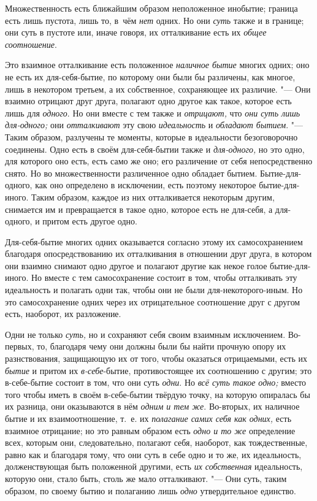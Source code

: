 Множественность есть ближайшим образом неположенное инобытие; граница есть лишь
пустота, лишь то, в~чём {\em нет} одних. Но они {\em суть} также и в границе;
они суть в пустоте или, иначе говоря, их отталкивание есть их
{\em общее соотношение}.

Это взаимное отталкивание есть положенное {\em наличное бытие} многих одних;
оно не есть их для-себя-бытие, по которому они были бы различены, как многое,
лишь в некотором третьем, а их собственное, сохраняющее их различие. "--- Они
взаимно отрицают друг друга, полагают одно другое как такое, которое есть лишь
для {\em одного}. Но они вместе с тем также и {\em отрицают,} что
{\em они суть лишь для-одного;} они {\em отталкивают} эту свою
{\em идеальность} и {\em обладают бытием}. "--- Таким образом, разлучены те
моменты, которые в идеальности безоговорочно соединены. Одно есть в своём
для-себя-бытии также и {\em для-одного,} но это одно, для которого оно есть,
есть само же оно; его различение от себя непосредственно снято. Но во
множественности различенное одно обладает бытием. Бытие-для-одного, как оно
определено в исключении, есть поэтому некоторое бытие-для-иного. Таким образом,
каждое из них отталкивается некоторым другим, снимается им и превращается в
такое одно, которое есть не для-себя, а для-одного, и притом есть другое одно.

Для-себя-бытие многих одних оказывается согласно этому их самосохранением
благодаря опосредствованию их отталкивания в отношении друг друга, в котором
они взаимно снимают одно другое и полагают другие как некое голое
бытие-для-иного. Но вместе с тем самосохранение состоит в том, чтобы
отталкивать эту идеальность и полагать одни так, чтобы они не были
для-некоторого-иным. Но это самосохранение одних через их отрицательное
соотношение друг с другом есть, наоборот, их разложение.

Одни не только {\em суть,} но и сохраняют себя своим взаимным исключением.
Во-первых, то, благодаря чему они должны были бы найти прочную опору их
разнствования, защищающую их от того, чтобы оказаться отрицаемыми, есть их
{\em бытие} и притом их {\em в-себе}-бытие, противостоящее их соотношению с
другим; это в-себе-бытие состоит в том, что они суть {\em одни}. Но
{\em всё суть такое одно;} вместо того чтобы иметь в своём в-себе-бытии твёрдую
точку, на которую опиралась бы их разница, они оказываются в нём
{\em одним и тем же}. Во-вторых, их наличное бытие и их взаимоотношение, т.~е.
их {\em полагание самих себя как одних,} есть взаимное отрицание; но это равным
образом есть {\em одно и то же} определение всех, которым они, следовательно,
полагают себя, наоборот, как тождественные, равно как и благодаря тому, что они
суть в себе одно и то же, их идеальность, долженствующая быть положенной
другими, есть {\em их собственная} идеальность, которую они, стало быть, столь
же мало отталкивают. "--- Они суть, таким образом, по своему бытию и полаганию
лишь {\em одно} утвердительное единство.

